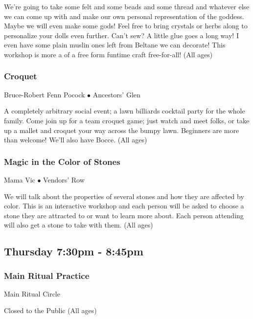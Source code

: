  We're going to take some felt and some beads and some thread and whatever else we can come up with and make our own personal representation of the goddess. Maybe we will even make some gods! Feel free to bring crystals or herbs along to personalize your dolls even further. Can't sew? A little glue goes a long way! I even have some plain muslin ones left from Beltane we can decorate! This workshop is more a of a free form funtime craft free-for-all! {\small (All ages)}

\subsubsection{Croquet}
\label{Thu-Croquet}
{\small Bruce-Robert Fenn Pocock $\bullet$  Ancestors' Glen}

 A completely arbitrary social event; a lawn billiards cocktail party for the whole family. Come join up for a team croquet game; just watch and meet folks, or take up a mallet and croquet your way across the bumpy lawn. Beginners are more than welcome! We'll also have Bocce. {\small (All ages)}

\subsubsection{Magic in the Color of Stones}
\label{Thu-magcolor}
{\small Mama Vic $\bullet$  Vendors' Row}

 We will talk about the properties of several stones and how they are affected by color.  This is an interactive workshop and each person will be asked to choose a stone they are attracted to or want to learn more about.  Each person attending will also get a stone to take with them. {\small (All ages)}

\subsection{Thursday 7:30pm - 8:45pm}

\subsubsection{Main Ritual Practice}
\label{Thu-Prac1}
{\small  Main Ritual Circle}

 Closed to the Public {\small (All ages)}